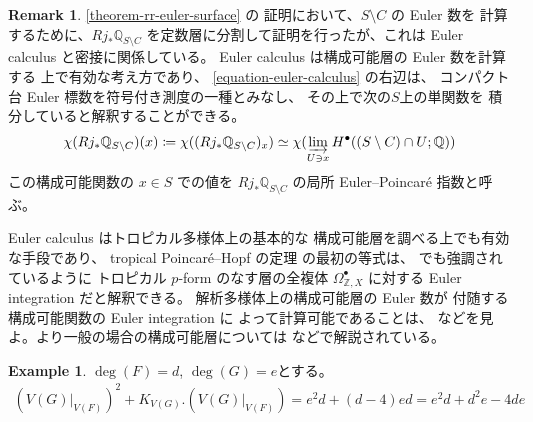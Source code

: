 \documentclass[a4paper,dvipdfmx,reqno,12pt]{amsart}
\theoremstyle{definition}
\newtheorem{example}[theorem]{Example}
\newtheorem{remark}[theorem]{Remark}
\newcommand{\deq}{\coloneqq}
\newcommand{\opn}[1]{\operatorname{#1}}
\numberwithin{equation}{section}
\begin{document}
\begin{remark}
\cref{theorem-rr-euler-surface} の
証明において、$S\setminus C$ の Euler 数を
計算するために、$Rj_*\mathbb{Q}_{S\setminus C}$
を定数層に分割して証明を行ったが、これは
Euler calculus と密接に関係している\cite{MR970076,MR1115569}。
Euler calculus は構成可能層の Euler 数を計算する
上で有効な考え方であり、
\cref{equation-euler-calculus} の右辺は、
コンパクト台 Euler 標数を符号付き測度の一種とみなし、
その上で次の$S$上の単関数を
積分していると解釈することができる。
\begin{align}
\chi(Rj_*\mathbb{Q}_{S\setminus C})(x)\deq \chi((Rj_*\mathbb{Q}_{S\setminus C})_x) 
\simeq \chi(\varinjlim_{U\ni x} H^{\bullet}((S\setminus C)
\cap U;\mathbb{Q}))   
\end{align}
この構成可能関数の $x\in S$ での値を
$Rj_*\mathbb{Q}_{S\setminus C}$
の局所 Euler--Poincar\'e 指数と呼ぶ。

Euler calculus はトロピカル多様体上の基本的な
構成可能層を調べる上でも有効な手段であり、
tropical Poincar\'e--Hopf の定理
\cite[Theorem 4.7]{} の最初の等式は、
\cite[Remark 4.8]{} でも強調されているように
トロピカル $p$-form のなす層の全複体 
$\Omega^{\bullet}_{\mathbb{Z},X}$ に対する Euler integration 
だと解釈できる。
解析多様体上の構成可能層の Euler 数が
付随する構成可能関数の Euler integration に
よって計算可能であることは、\cite[Theorem 9.7.1]{MR1299726}
などを見よ。より一般の場合の構成可能層については
\cite[Chapter 2]{MR2031639} などで解説されている。
\end{remark}

\begin{example}
$\opn{deg}(F)=d$, $\opn{deg}(G)=e$とする。
\begin{align}
(V(G)|_{V(F)})^{2}+K_{V(G)}.(V(G)|_{V(F)})
=e^2d+(d-4)ed=e^2d+d^2e-4de
\end{align}

\end{example}
\end{document}
